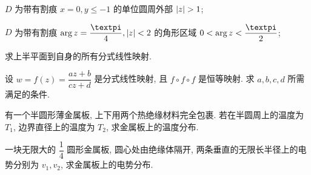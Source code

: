 \begin{homework}
\begin{homework}
\begin{subhomework}
      \item $D$ 为带有割痕 $x=0,y\le -1$ 的单位圆周外部 $\lvert z\rvert>1$;
      \item $D$ 为带有割痕 $\arg z=\dfrac\cpi4, \abs{z}<2$ 的角形区域 $0<\arg z<\dfrac\cpi2$;
    \end{subhomework}
    \item 求上半平面到自身的所有分式线性映射.
    \item \optionalex 设 $w=f(z)=\dfrac{az+b}{cz+d}$ 是分式线性映射, 且 $f\circ f\circ f$ 是恒等映射. 求 $a,b,c,d$ 所需满足的条件.
    \item \optionalex 有一个半圆形薄金属板, 上下用两个热绝缘材料完全包裹. 若在半圆周上的温度为 $T_1$, 边界直径上的温度为 $T_2$, 求金属板上的温度分布.
    \item \optionalex 一块无限大的 $\dfrac14$ 圆形金属板, 圆心处由绝缘体隔开, 两条垂直的无限长半径上的电势分别为 $v_1,v_2$, 求金属板上的电势分布.
  \end{homework}
\end{homework}
  


